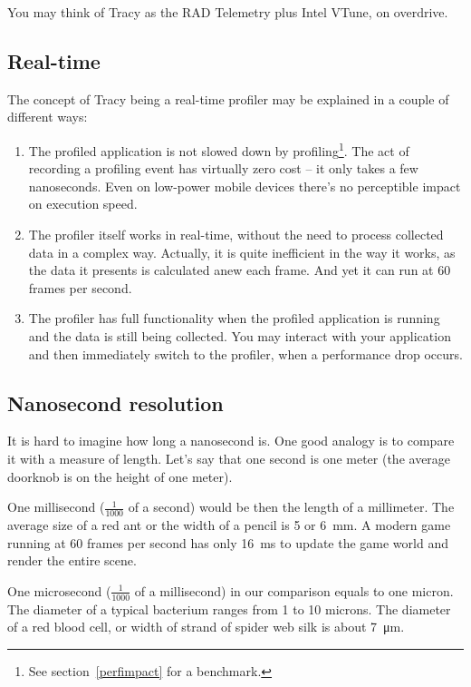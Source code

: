 \documentclass[hidelinks,titlepage,a4paper]{article}
\begin{document}
You may think of Tracy as the RAD Telemetry plus Intel VTune, on overdrive.

\subsection{Real-time}

The concept of Tracy being a real-time profiler may be explained in a couple of different ways:

\begin{enumerate}
\item The profiled application is not slowed down by profiling\footnote{See section~\ref{perfimpact} for a benchmark.}. The act of recording a profiling event has virtually zero cost -- it only takes a few nanoseconds. Even on low-power mobile devices there's no perceptible impact on execution speed.
\item The profiler itself works in real-time, without the need to process collected data in a complex way. Actually, it is quite inefficient in the way it works, as the data it presents is calculated anew each frame. And yet it can run at 60 frames per second.
\item The profiler has full functionality when the profiled application is running and the data is still being collected. You may interact with your application and then immediately switch to the profiler, when a performance drop occurs.
\end{enumerate}

\subsection{Nanosecond resolution}

It is hard to imagine how long a nanosecond is. One good analogy is to compare it with a measure of length. Let's say that one second is one meter (the average doorknob is on the height of one meter).

One millisecond ($\frac{1}{1000}$ of a second) would be then the length of a millimeter. The average size of a red ant or the width of a pencil is 5 or 6~\si{\milli\metre}. A modern game running at 60 frames per second has only 16~\si{\milli\second} to update the game world and render the entire scene.

One microsecond ($\frac{1}{1000}$ of a millisecond) in our comparison equals to one micron. The diameter of a typical bacterium ranges from 1 to 10 microns. The diameter of a red blood cell, or width of strand of spider web silk is about 7~\si{\micro\metre}.
\end{document}
